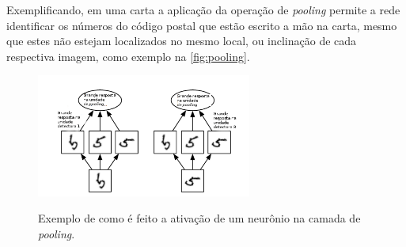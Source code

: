 \par Exemplificando, em uma carta a aplicação da operação de \textit{pooling} permite a rede identificar os números do código postal que estão escrito a mão na carta, mesmo que estes não estejam localizados no mesmo local, ou inclinação de cada respectiva imagem, como exemplo na \autoref{fig:pooling}. 
\begin{figure}[H]
  \centering
  \caption{Exemplo de como é feito a ativação de um neurônio na camada de \textit{pooling}.}
  \includegraphics[width=200pt]{dados/figuras/pooling}
  \label{fig:pooling}
\end{figure} 


